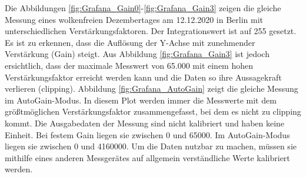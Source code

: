 Die Abbildungen \ref{fig:Grafana_Gain0}-\ref{fig:Grafana_Gain3} zeigen die gleiche Messung eines wolkenfreien Dezembertages am 12.12.2020 in Berlin mit unterschiedlichen Verstärkungsfaktoren. Der Integrationswert ist auf 255 gesetzt.\\
Es ist zu erkennen, dass die Auflösung der Y-Achse mit zunehmender Verstärkung (Gain) steigt. Aus Abbildung \ref{fig:Grafana_Gain3} ist jedoch ersichtlich, dass der maximale Messwert von 65.000 mit einem hohen Verstärkungsfaktor erreicht werden kann und die Daten so ihre Aussagekraft verlieren (clipping).
Abbildung \ref{fig:Grafana_AutoGain} zeigt die gleiche Messung im AutoGain-Modus. 
In diesem Plot werden immer die Messwerte mit dem größtmöglichen Verstärkungsfaktor zusammengefasst, bei dem es nicht zu clipping kommt.
Die Ausgabedaten der Messung sind nicht kalibriert und haben keine Einheit. Bei festem Gain liegen sie zwischen 0 und 65000.
Im AutoGain-Modus liegen sie zwischen 0 und 4160000.
Um die Daten nutzbar zu machen, müssen sie mithilfe eines anderen Messgerätes auf allgemein verständliche Werte kalibriert werden.

